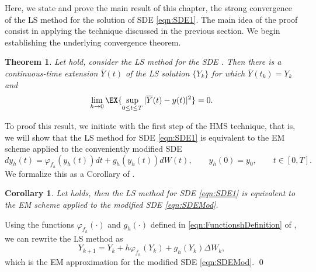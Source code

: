 \documentclass[sort&compress, preprint]{elsarticle}
\theoremstyle{definition}
\theoremstyle{plain}%
\newtheorem{thm}{Theorem}[section]
\newtheorem{corollary}{Corollary}[section]
\theoremstyle{remark}
\newcommand{\SM}{LS\xspace}
\begin{document}
	Here, we state and prove the main result of this chapter, the strong convergence of the \SM method
  for the solution of SDE \eqref{eqn:SDE1}.
The main idea of the proof consist in applying the technique discussed in the previous section.
We begin establishing the underlying convergence theorem.
\begin{thm} %
	\label{thm:StrongConvergenceLSMethod}
	Let  hold, consider the \SM method  for the 
	SDE	.
	Then there is a continuous-time extension $\overline{Y}(t)$ of the \SM solution $\{Y_k\}$ for which 
	$\overline{Y}(t_k)=Y_k$ and
	\begin{equation*}
	\lim_{h \to 0}
	\EX{
		\sup_{0\leq t \leq T}
		|\overline{Y}(t) - y(t)|^2	
	}=0.
	\end{equation*} 
\end{thm}
To proof this result, we initiate with the first step of the HMS technique, that is, we will show that the \SM method
for SDE \eqref{eqn:SDE1} is equivalent to the EM scheme applied to the conveniently modified SDE
	\begin{equation} \label{eqn:SDEMod}
		dy_h(t)= \varphi_{f_h}(y_h(t))dt +g_h(y_h(t))dW(t),
		\qquad y_h(0)=y_0,  \qquad t\in [0,T].
	\end{equation}
We formalize this as a Corollary of .

\begin{corollary}\label{col:SSSMeEMmod}
	Let  holds, then the \SM method for SDE \eqref{eqn:SDE1} is 
	equivalent to the EM scheme applied to the modified SDE \eqref{eqn:SDEMod}.
\end{corollary}
\begin{pf}
	Using the functions $\varphi_{f_h}(\cdot)$ and $g_h(\cdot)$ defined in \eqref{eqn:FunctionshDefinition} of 
	, we 
	can rewrite the \SM method  as 
	$$
		Y_{k+1} = Y_k + h \varphi_{f_h}(Y_k) + g_h(Y_k)\Delta W_k,
	$$
	which is the EM approximation for the modified SDE \eqref{eqn:SDEMod}. \qed
\end{pf}
\end{document}
